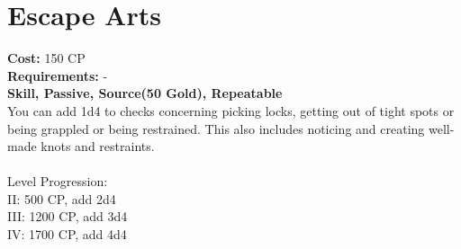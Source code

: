 \section{Escape Arts}
\textbf{Cost:} 150 CP\\
\textbf{Requirements:} -\\
\textbf{Skill, Passive, Source(50 Gold), Repeatable}\\
You can add 1d4 to checks concerning picking locks, getting out of tight spots or being grappled or being restrained. This also includes noticing and creating well-made knots and restraints.\\
\\
Level Progression:\\
II: 500 CP, add 2d4\\
III: 1200 CP, add 3d4\\
IV: 1700 CP, add 4d4\\